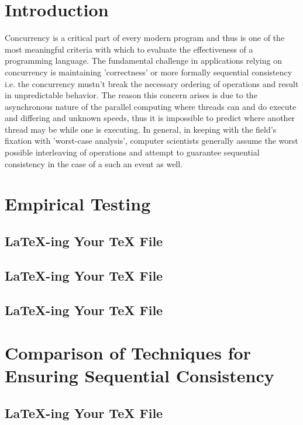 \section{Introduction}
Concurrency is a critical part of every modern program and thus is one of the most meaningful criteria with which to evaluate the effectiveness of a programming language. The fundamental challenge in applications relying on concurrency is maintaining 'correctness' or more formally sequential consistency i.e. the concurrency mustn't break the necessary ordering of operations and result in unpredictable behavior. The reason this concern arises is due to the asynchronous nature of the parallel computing where threads can and do execute and differing and unknown speeds, thus it is impossible to predict where another thread may be while one is executing. In general, in keeping with the field's fixation with 'worst-case analysis', computer scientists generally assume the worst possible interleaving of operations and attempt to guarantee sequential consistency in the case of a such an event as well.  

\section{Empirical Testing}

\subsection{LaTeX-ing Your TeX File}
\subsection{LaTeX-ing Your TeX File}
\subsection{LaTeX-ing Your TeX File}

\section{Comparison of Techniques for Ensuring Sequential Consistency}
\label{sec:figs}

\subsection{LaTeX-ing Your TeX File}



